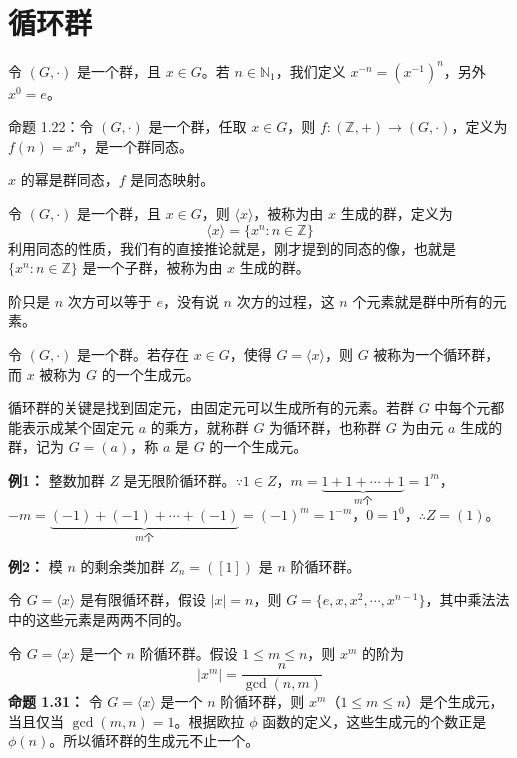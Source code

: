 \section{循环群}

\begin{definition}[定义 1.22：$x$ 的幂]
令 $(G,\cdot)$ 是一个群，且 $x\in G$。若 $n\in\mathbb{N}_1$，我们定义 $x^{-n}=(x^{-1})^n$，另外 $x^0=e$。

命题 1.22：令 $(G,\cdot)$ 是一个群，任取 $x\in G$，则 $f:(\mathbb{Z},+)\to(G,\cdot)$，定义为 $f(n)=x^n$，是一个群同态。

$x$ 的幂是群同态，$f$ 是同态映射。
\end{definition}

\begin{definition}[由 $x$ 生成子群（定义 1.23）]
令 $(G,\cdot)$ 是一个群，且 $x\in G$，则 $\langle x\rangle$，被称为由 $x$ 生成的群，定义为
\[
\langle x\rangle=\{x^n:n\in\mathbb{Z}\}
\]
利用同态的性质，我们有的直接推论就是，刚才提到的同态的像，也就是 $\{x^n:n\in\mathbb{Z}\}$ 是一个子群，被称为由 $x$ 生成的群。

阶只是 $n$ 次方可以等于 $e$，没有说 $n$ 次方的过程，这 $n$ 个元素就是群中所有的元素。
\end{definition}

\begin{definition}[循环群（定义 1.25）]
令 $(G,\cdot)$ 是一个群。若存在 $x\in G$，使得 $G=\langle x\rangle$，则 $G$ 被称为一个循环群，而 $x$ 被称为 $G$ 的一个生成元。

循环群的关键是找到固定元，由固定元可以生成所有的元素。若群 $G$ 中每个元都能表示成某个固定元 $a$ 的乘方，就称群 $G$ 为循环群，也称群 $G$ 为由元 $a$ 生成的群，记为 $G=(a)$，称 $a$ 是 $G$ 的一个生成元。

\textbf{例1：} 整数加群 $Z$ 是无限阶循环群。$\because 1\in Z$，$m=\underbrace{1+1+\cdots+1}_{m\text{个}}=1^m$，$-m=\underbrace{(-1)+(-1)+\cdots+(-1)}_{m\text{个}}=(-1)^m=1^{-m}$，$0=1^0$，$\therefore Z=(1)$。

\textbf{例2：} 模 $n$ 的剩余类加群 $Z_n=([1])$ 是 $n$ 阶循环群。
\end{definition}

\begin{proposition}[命题 1.26：有限循环群的结构]
令 $G=\langle x\rangle$ 是有限循环群，假设 $|x|=n$，则 $G=\{e,x,x^2,\cdots,x^{n-1}\}$，其中乘法法中的这些元素是两两不同的。
\end{proposition}

\begin{proposition}[命题 1.30：循环群的生成元]
令 $G=\langle x\rangle$ 是一个 $n$ 阶循环群。假设 $1\le m\le n$，则 $x^m$ 的阶为
\[
|x^m|=\frac{n}{\gcd(n,m)}
\]
\textbf{命题 1.31：} 令 $G=\langle x\rangle$ 是一个 $n$ 阶循环群，则 $x^m$（$1\le m\le n$）是个生成元，当且仅当 $\gcd(m,n)=1$。根据欧拉 $\phi$ 函数的定义，这些生成元的个数正是 $\phi(n)$。所以循环群的生成元不止一个。
\end{proposition}

